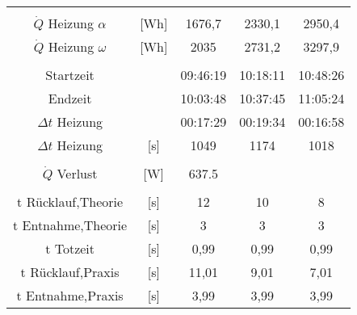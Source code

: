 \begin{table}[h!]
{\begin{tabular}{|c|c|c|c|c|}
			&                             &                    &                    &                    \\
			$\dot{Q}$ Heizung $\alpha$                     & [Wh]                    & 1676,7             & 2330,1             & 2950,4             \\
		$\dot{Q}$  Heizung $\omega$                    & [Wh]                    & 2035               & 2731,2             & 3297,9             \\
			&                             &                    &                    &                    \\
			Startzeit                      &                             & 09:46:19           & 10:18:11           & 10:48:26           \\
			Endzeit                        &                             & 10:03:48           & 10:37:45           & 11:05:24           \\
			$\Delta t$ Heizung                      &                             & 00:17:29           & 00:19:34           & 00:16:58           \\
			$\Delta t$ Heizung                       & [s]                     & 1049               & 1174               & 1018               \\
			&                             &                    &                    &                    \\
			 $\dot{Q}$ Verlust  &  [W] &   \SI{637,5}{}                 &                    &                    \\
			&                             &                    &                    &                    \\
			t Rücklauf,Theorie              & [s]                     & 12                 & 10                 & 8                  \\
			t Entnahme,Theorie              & [s]                     & 3                  & 3                  & 3                  \\
			
			t Totzeit                       & [s]                     & 0,99               & 0,99               & 0,99               \\
			t Rücklauf,Praxis               & [s]                     & 11,01              & 9,01               & 7,01               \\
			t Entnahme,Praxis               & [s]                     & 3,99               & 3,99               & 3,99              \\
			\hline
			
		\end{tabular}
	}
\end{table}
\FloatBarrier
\vspace*{-2.5mm}
 
